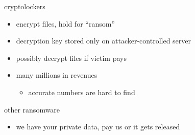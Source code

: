 
\begin{frame}{cryptolockers}
    \begin{itemize}
        \item encrypt files, hold for ``ransom''
        \item decryption key stored only on attacker-controlled server
        \item possibly decrypt files if victim pays
        \vspace{.5cm}
        \item many millions in revenues 
        \begin{itemize}
            \item accurate numbers are hard to find
        \end{itemize}
    \end{itemize}
\end{frame}



\begin{frame}{other ransomware}
    \begin{itemize}
    \item we have your private data, pay us or it gets released
    \end{itemize}
\end{frame}
